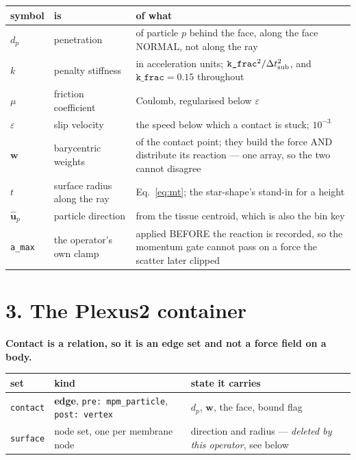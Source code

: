 \documentclass[10pt,a4paper]{article}
\newcommand{\code}[1]{\texttt{#1}}
\begin{document}
\smallskip
{\small\begin{tabular}{@{}llp{8.6cm}@{}}\toprule
symbol & is & of what\\\midrule
$d_p$ & penetration & of particle $p$ behind the face, along the face NORMAL, not along the ray\\
$k$ & penalty stiffness & in acceleration units; $\code{k\_frac}^2/\Delta t_{\rm sub}^2$, and
  $\code{k\_frac}=0.15$ throughout\\
$\mu$ & friction coefficient & Coulomb, regularised below $\varepsilon$\\
$\varepsilon$ & slip velocity & the speed below which a contact is stuck; $10^{-3}$\\
$\mathbf w$ & barycentric weights & of the contact point; they build the force AND distribute its
  reaction --- one array, so the two cannot disagree\\
$t$ & surface radius along the ray & Eq.~\eqref{eq:mt}; the star-shape's stand-in for a height\\
$\hat{\mathbf u}_p$ & particle direction & from the tissue centroid, which is also the bin key\\
\code{a\_max} & the operator's own clamp & applied BEFORE the reaction is recorded, so the momentum
  gate cannot pass on a force the scatter later clipped\\
\bottomrule\end{tabular}}

\section*{3.\; The Plexus2 container}

\textbf{Contact is a relation, so it is an edge set and not a force field on a body.}

\begin{center}\small
\begin{tabular}{@{}lll@{}}\toprule
\textbf{set} & \textbf{kind} & \textbf{state it carries}\\\midrule
\code{contact} & \textbf{edge}, \code{pre: mpm\_particle}, \code{post: vertex} & $d_p$, $\mathbf w$,
  the face, bound flag\\
\code{surface} & node set, one per membrane node & direction and radius --- \emph{deleted by this
  operator}, see below\\
\bottomrule\end{tabular}
\end{center}
\end{document}
